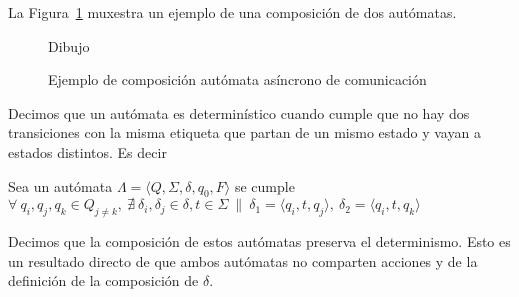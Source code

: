 






La Figura~\ref{fig:ejemplo-aa} muxestra un ejemplo de una composición de dos autómatas. 

\begin{figure}[ht]
\begin{center}
Dibujo
\end{center}
\caption{Ejemplo de composición autómata asíncrono de comunicación}
\label{fig:ejemplo-aa}
\end{figure} 

\begin{definition}[Determinismo] Decimos que un autómata es determinístico cuando cumple que no hay dos transiciones con la misma etiqueta que partan de un mismo estado y vayan a estados distintos. Es decir 

\begin{centering}
Sea un autómata $ \Lambda = \langle Q, \Sigma, \delta, q_0, F \rangle$ se cumple
$ \forall \  q_i, q_j, q_k \in Q_{j \neq k}, \  \nexists \ \delta_i, \delta_j \in \delta, t \in \Sigma \ \| \  \delta_1 = \langle q_i, t, q_j \rangle, \ \delta_2 = \langle q_i, t, q_k \rangle$ \\
\end{centering} 

Decimos que la composición de estos autómatas preserva el determinismo. Esto es un resultado directo de que ambos autómatas no comparten acciones y de la definición de la composición de $\delta$.

\end{definition}


